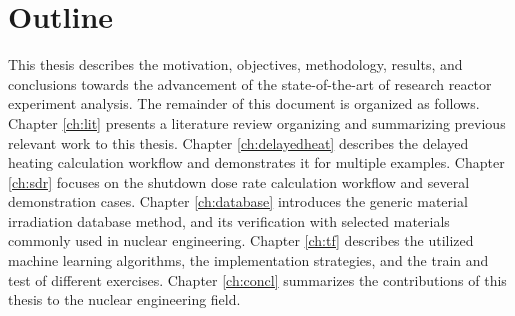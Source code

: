 \section{Outline}

This thesis describes the motivation, objectives, methodology, results, and conclusions towards the advancement of the state-of-the-art of research reactor experiment analysis.
The remainder of this document is organized as follows.
Chapter \ref{ch:lit} presents a literature review organizing and summarizing previous relevant work to this thesis.
Chapter \ref{ch:delayedheat} describes the delayed heating calculation workflow and demonstrates it for  multiple examples.
Chapter \ref{ch:sdr} focuses on the shutdown dose rate calculation workflow and several demonstration cases.
Chapter \ref{ch:database} introduces the generic material irradiation database method, and its verification with selected materials commonly used in nuclear engineering.
Chapter \ref{ch:tf} describes the utilized machine learning algorithms, the implementation strategies, and the train and test of different exercises.
Chapter \ref{ch:concl} summarizes the contributions of this thesis to the nuclear engineering field.


